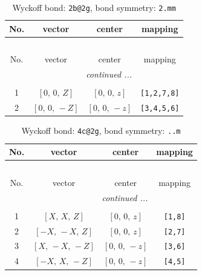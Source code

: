 \documentclass[fleqn,8pt]{jsarticle}
\begin{document}
\renewcommand{\arraystretch}{1.2}
\begin{longtable}{cccc}
\caption{Wyckoff bond: {\tt 2b@2g}, bond symmetry: {\tt 2.mm}}
 \\
 \hline \hline
No. & vector & center & mapping \\ \hline \endfirsthead

\multicolumn{3}{l}{\tablename\ \thetable{}} \\
 \hline \hline
No. & vector & center & mapping \\ \hline \endhead

 \hline \hline
\multicolumn{3}{r}{\footnotesize\it continued ...} \\ \endfoot

 \hline \hline
\multicolumn{3}{r}{} \\ \endlastfoot

1 & $\left[ 0,\, 0,\, Z \right]$ & $\left[ 0,\, 0,\, z \right]$ & {\tt [1,2,7,8]} \\ \hline
2 & $\left[ 0,\, 0,\, - Z \right]$ & $\left[ 0,\, 0,\, - z \right]$ & {\tt [3,4,5,6]} \\
\end{longtable}
\renewcommand{\arraystretch}{1.2}
\begin{longtable}{cccc}
\caption{Wyckoff bond: {\tt 4c@2g}, bond symmetry: {\tt ..m}}
 \\
 \hline \hline
No. & vector & center & mapping \\ \hline \endfirsthead

\multicolumn{3}{l}{\tablename\ \thetable{}} \\
 \hline \hline
No. & vector & center & mapping \\ \hline \endhead

 \hline \hline
\multicolumn{3}{r}{\footnotesize\it continued ...} \\ \endfoot

 \hline \hline
\multicolumn{3}{r}{} \\ \endlastfoot

1 & $\left[ X,\, X,\, Z \right]$ & $\left[ 0,\, 0,\, z \right]$ & {\tt [1,8]} \\ \hline
2 & $\left[ - X,\, - X,\, Z \right]$ & $\left[ 0,\, 0,\, z \right]$ & {\tt [2,7]} \\ \hline
3 & $\left[ X,\, - X,\, - Z \right]$ & $\left[ 0,\, 0,\, - z \right]$ & {\tt [3,6]} \\ \hline
4 & $\left[ - X,\, X,\, - Z \right]$ & $\left[ 0,\, 0,\, - z \right]$ & {\tt [4,5]} \\
\end{longtable}
\end{document}
